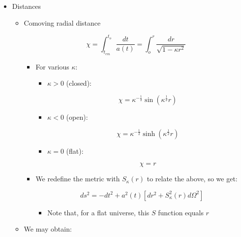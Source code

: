\begin{itemize}
\begin{itemize}
\begin{itemize}
        \end{itemize}

    \end{itemize}

  \item Distances

    \begin{itemize}

      \item Comoving radial distance

        $$\chi=\int_{t_{em}}^{t_o}\frac{dt}{a(t)}=\int_o^r \frac{dr}{\sqrt{1-\kappa r^2}}$$

        \begin{itemize}

          \item For various $\kappa$:

            \begin{itemize}

              \item $\kappa>0$ (closed):

                $$\chi=\kappa^{-\frac{1}{2}}\sin(\kappa^{\frac{1}{2}}r)$$

              \item $\kappa<0$ (open):

                $$\chi=\kappa^{-\frac{1}{2}}\sinh(\kappa^{\frac{1}{2}}r)$$

              \item $\kappa=0$ (flat):

                $$\chi=r$$

            \end{itemize}

          \item We redefine the metric with $S_{\kappa}(r)$ to relate the above, so we get:

            $$ds^2=-dt^2+a^2(t)\left[ dr^2+S_{\kappa}^2(r)d\Omega^2 \right]$$

            \begin{itemize}

              \item Note that, for a flat universe, this $S$ function equals $r$

            \end{itemize}

        \end{itemize}

      \item We may obtain:


\end{itemize}
\end{itemize}
